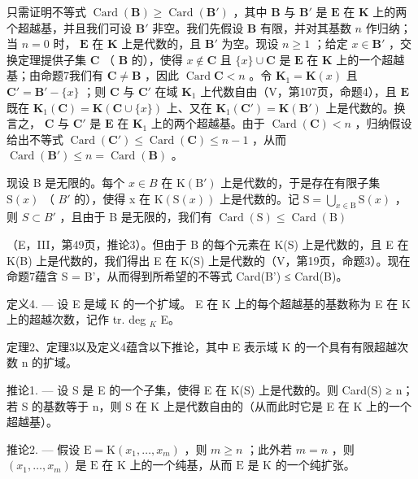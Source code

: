 只需证明不等式 \(\operatorname{Card}(\mathbf{B}) \geqslant \operatorname{Card}(\mathbf{B}')\) ，其中 \(\mathbf{B}\) 与 \(\mathbf{B}'\) 是 \(\mathbf{E}\) 在 \(\mathbf{K}\) 上的两个超越基，并且我们可设 \(\mathbf{B}'\) 非空。我们先假设 \(\mathbf{B}\) 有限，并对其基数 \(n\) 作归纳；当 \(n = 0\) 时， \(\mathbf{E}\) 在 \(\mathbf{K}\) 上是代数的，且 \(\mathbf{B}'\) 为空。现设 \(n \geqslant 1\) ；给定 \(x \in \mathbf{B}'\) ，交换定理提供子集 \(\mathbf{C}\) （ \(\mathbf{B}\) 的），使得 \(x \notin \mathbf{C}\) 且 \(\{x\} \cup \mathbf{C}\) 是 \(\mathbf{E}\) 在 \(\mathbf{K}\) 上的一个超越基；由命题7我们有 \(\mathbf{C} \neq \mathbf{B}\) ，因此 \(\operatorname{Card} \mathbf{C} < n\) 。令 \(\mathbf{K}_1 = \mathbf{K}(x)\) 且 \(\mathbf{C}' = \mathbf{B}' - \{x\}\) ；则 \(\mathbf{C}\) 与 \(\mathbf{C}'\) 在域 \(\mathbf{K}_1\) 上代数自由（V，第107页，命题4），且 \(\mathbf{E}\) 既在 \(\mathbf{K}_1(\mathbf{C}) = \mathbf{K}(\mathbf{C} \cup \{x\})\) 上、又在 \(\mathbf{K}_1(\mathbf{C}') = \mathbf{K}(\mathbf{B}')\) 上是代数的。换言之， \(\mathbf{C}\) 与 \(\mathbf{C}'\) 是 \(\mathbf{E}\) 在 \(\mathbf{K}_1\) 上的两个超越基。由于 \(\operatorname{Card}(\mathbf{C}) < n\) ，归纳假设给出不等式 \(\operatorname{Card}(\mathbf{C}') \leqslant \operatorname{Card}(\mathbf{C}) \leqslant n - 1\) ，从而 \(\operatorname{Card}(\mathbf{B}') \leqslant n = \operatorname{Card}(\mathbf{B})\) 。

现设 B 是无限的。每个 \(x \in B\) 在 \(\mathrm{K}(\mathrm{B}')\) 上是代数的，于是存在有限子集 \(\mathrm{S}(x)\) （ \(B'\) 的），使得 x 在 \(\mathrm{K}(\mathrm{S}(x))\) 上是代数的。记 \(\mathrm{S} = \bigcup_{x \in \mathrm{B}} \mathrm{S}(x)\) ，则 \(S \subset B'\) ，且由于 B 是无限的，我们有 \(\operatorname{Card}(\mathrm{S}) \leqslant \operatorname{Card}(\mathrm{B})\)

（E，III，第49页，推论3）。但由于 B 的每个元素在 K(S) 上是代数的，且 E 在 K(B) 上是代数的，我们得出 E 在 K(S) 上是代数的（V，第19页，命题3）。现在命题7蕴含 S = B'，从而得到所希望的不等式 Card(B') ≤ Card(B)。

定义4. --- 设 E 是域 K 的一个扩域。 E 在 K 上的每个超越基的基数称为 E 在 K 上的超越次数，记作 tr. deg \(_{K}\) E。

定理2、定理3以及定义4蕴含以下推论，其中 E 表示域 K 的一个具有有限超越次数 n 的扩域。

推论1. --- 设 S 是 E 的一个子集，使得 E 在 K(S) 上是代数的。则 Card(S) ≥ n；若 S 的基数等于 n，则 S 在 K 上是代数自由的（从而此时它是 E 在 K 上的一个超越基）。

推论2. --- 假设 \(\mathrm{E} = \mathrm{K}(x_1, \ldots, x_m)\) ，则 \(m \geqslant n\) ；此外若 \(m = n\) ，则 \((x_1, \ldots, x_m)\) 是 \(\mathrm{E}\) 在 \(\mathrm{K}\) 上的一个纯基，从而 \(\mathrm{E}\) 是 \(\mathrm{K}\) 的一个纯扩张。

